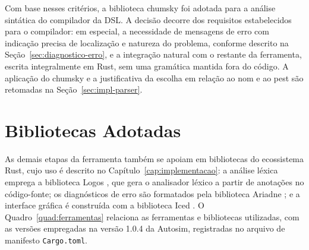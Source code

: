 \documentclass[
    12pt
    ,oneside
    ,a4paper
    ,chapter=TITLE
    ,section=TITLE
    ,sumario=abnt-6027-2012]{abntex2}
\begin{document}
Com base nesses critérios, a biblioteca chumsky foi adotada para a análise sintática do
compilador da DSL. A decisão decorre dos requisitos estabelecidos para o compilador: em
especial, a necessidade de mensagens de erro com indicação precisa de localização e natureza
do problema, conforme descrito na Seção~\ref{sec:diagnostico-erro}, e a integração natural
com o restante da ferramenta, escrita integralmente em Rust, sem uma gramática mantida fora
do código. A aplicação do chumsky e a justificativa da escolha em relação ao nom e ao pest
são retomadas na Seção~\ref{sec:impl-parser}.

\section{Bibliotecas Adotadas}
\label{sec:ferr-bibliotecas}

As demais etapas da ferramenta também se apoiam em bibliotecas do ecossistema Rust, cujo uso
é descrito no Capítulo~\ref{cap:implementacao}: a análise léxica emprega a biblioteca Logos
\cite{logos2021}, que gera o analisador léxico a partir de anotações no código-fonte; os
diagnósticos de erro são formatados pela biblioteca Ariadne \cite{ariadne2021}; e a interface
gráfica é construída com a biblioteca Iced \cite{iced2022}. O Quadro~\ref{quad:ferramentas}
relaciona as ferramentas e bibliotecas utilizadas, com as versões empregadas na versão 1.0.4 da
Autosim, registradas no arquivo de manifesto \texttt{Cargo.toml}.
\end{document}
